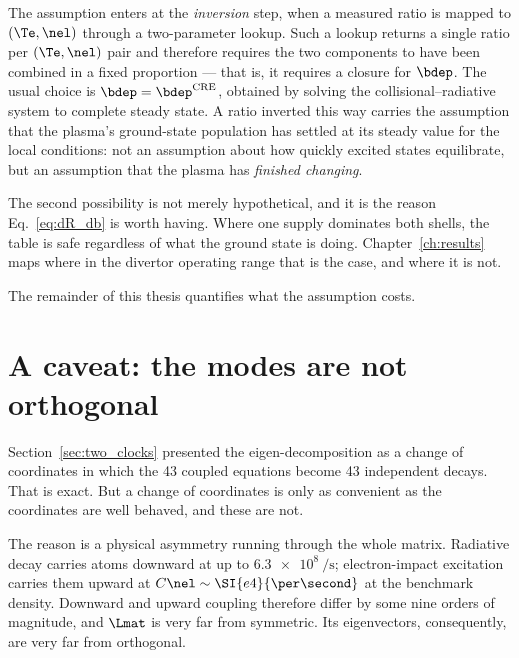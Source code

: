 The assumption enters at the \emph{inversion} step, when a measured ratio is
mapped to $(\Te,\nel)$ through a two-parameter lookup. Such a lookup returns a
single ratio per $(\Te,\nel)$ pair and therefore requires the two components to
have been combined in a fixed proportion --- that is, it requires a closure for
$\bdep$. The usual choice is $\bdep = \bdep^{\mathrm{CRE}}$, obtained by solving
the collisional--radiative system to complete steady state. A ratio inverted this
way carries the assumption that the plasma's ground-state population has settled
at its steady value for the local conditions: not an assumption about how quickly
excited states equilibrate, but an assumption that the plasma has \emph{finished
changing}.

The second possibility is not merely hypothetical, and it is the reason
Eq.~\eqref{eq:dR_db} is worth having. Where one supply dominates both shells,
the table is safe regardless of what the ground state is doing.
Chapter~\ref{ch:results} maps where in the divertor operating range that is the
case, and where it is not.

The remainder of this thesis quantifies what the assumption costs.

\section{A caveat: the modes are not orthogonal}
\label{sec:transient_growth}

Section~\ref{sec:two_clocks} presented the eigen-decomposition as a change of
coordinates in which the 43 coupled equations become 43 independent decays. That
is exact. But a change of coordinates is only as convenient as the coordinates
are well behaved, and these are not.

The reason is a physical asymmetry running through the whole matrix. Radiative
decay carries atoms downward at up to $\SI{6.3e8}{\per\second}$; electron-impact
excitation carries them upward at $C\nel \sim \SI{e4}{\per\second}$ at the
benchmark density. Downward and upward coupling therefore differ by some nine
orders of magnitude, and $\Lmat$ is very far from symmetric. Its eigenvectors,
consequently, are very far from orthogonal.

